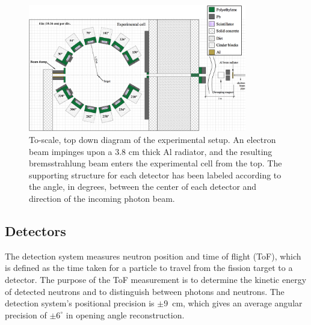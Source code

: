 \documentclass[%
 reprint,
 amsmath,amssymb,
 aps,
 nofootinbib
]{revtex4-1}
\begin{document}
\begin{figure}[h]
\includegraphics[width=0.85\textwidth, angle=90]{ExpArangment.jpg}
\caption{To-scale, top down diagram of the experimental setup.
An electron beam impinges upon a 3.8 cm thick Al radiator, and the resulting bremsstrahlung beam enters the experimental cell from the top.
The supporting structure for each detector has been labeled according to the angle, in degrees, between the center of each detector and direction of the incoming photon beam.
}
\label{fig:Facility}
\end{figure}

\subsection{Detectors}
\label{subsection:detectors}
The detection system measures neutron position and time of flight (ToF), which is defined as the time taken for a particle to travel from the fission target to a detector.
The purpose of the ToF measurement is to determine the kinetic energy of detected neutrons and to distinguish between photons and neutrons.
The detection system's positional precision is $\pm$9~cm, which gives an average angular precision of $\pm6^{\circ}$ in opening angle reconstruction.
\end{document}
